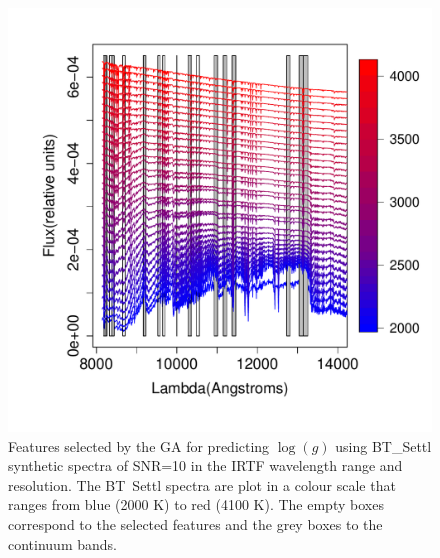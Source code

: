 \begin {figure}
 \centering
  \includegraphics[scale=0.55]{figs/BT-spectraAtIRTF-10-logg}
  \caption{Features selected by the GA for predicting $\log(g)$ using
    BT\_Settl synthetic spectra of SNR=10 in the IRTF wavelength range
    and resolution. The BT\ Settl spectra are plot in a colour scale
    that ranges from blue (2000 K) to red (4100 K). The empty boxes
    correspond to the selected features and the grey boxes to the
    continuum bands.}
\label{fig:irtf-logg-10}
\end {figure}

